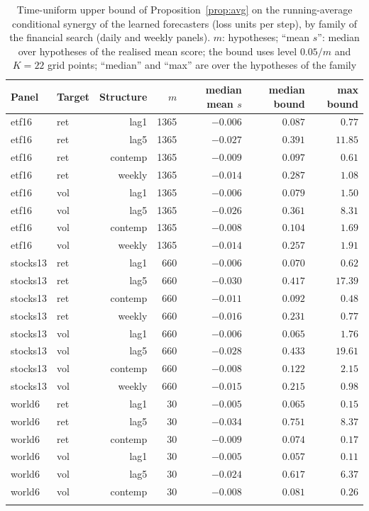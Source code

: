\documentclass[pdflatex,sn-mathphys-ay]{sn-jnl}%
\theoremstyle{thmstyleone}%
\theoremstyle{thmstyletwo}%
\theoremstyle{thmstylethree}%
\begin{document}
\begin{appendices}
\begin{table}[h]
\caption{Time-uniform upper bound of Proposition~\ref{prop:avg} on the running-average conditional synergy of the learned forecasters (loss units per step), by family of the financial search
(daily and weekly panels). $m$: hypotheses; ``mean $s$'': median over hypotheses of the realised mean score; the bound uses level $0.05/m$ and $K=22$ grid points; ``median'' and ``max'' are over the hypotheses of the family}\label{tab:avgbound}
\footnotesize
\begin{tabular}{llrrrrr}
\toprule
Panel & Target & Structure & $m$ & median mean $s$ & median bound & max bound \\
\midrule
etf16 & ret & lag1 & 1365 & $-0.006$ & $0.087$ & $0.77$ \\
etf16 & ret & lag5 & 1365 & $-0.027$ & $0.391$ & $11.85$ \\
etf16 & ret & contemp & 1365 & $-0.009$ & $0.097$ & $0.61$ \\
etf16 & ret & weekly & 1365 & $-0.014$ & $0.287$ & $1.08$ \\
etf16 & vol & lag1 & 1365 & $-0.006$ & $0.079$ & $1.50$ \\
etf16 & vol & lag5 & 1365 & $-0.026$ & $0.361$ & $8.31$ \\
etf16 & vol & contemp & 1365 & $-0.008$ & $0.104$ & $1.69$ \\
etf16 & vol & weekly & 1365 & $-0.014$ & $0.257$ & $1.91$ \\
stocks13 & ret & lag1 & 660 & $-0.006$ & $0.070$ & $0.62$ \\
stocks13 & ret & lag5 & 660 & $-0.030$ & $0.417$ & $17.39$ \\
stocks13 & ret & contemp & 660 & $-0.011$ & $0.092$ & $0.48$ \\
stocks13 & ret & weekly & 660 & $-0.016$ & $0.231$ & $0.77$ \\
stocks13 & vol & lag1 & 660 & $-0.006$ & $0.065$ & $1.76$ \\
stocks13 & vol & lag5 & 660 & $-0.028$ & $0.433$ & $19.61$ \\
stocks13 & vol & contemp & 660 & $-0.008$ & $0.122$ & $2.15$ \\
stocks13 & vol & weekly & 660 & $-0.015$ & $0.215$ & $0.98$ \\
world6 & ret & lag1 & 30 & $-0.005$ & $0.065$ & $0.15$ \\
world6 & ret & lag5 & 30 & $-0.034$ & $0.751$ & $8.37$ \\
world6 & ret & contemp & 30 & $-0.009$ & $0.074$ & $0.17$ \\
world6 & vol & lag1 & 30 & $-0.005$ & $0.057$ & $0.11$ \\
world6 & vol & lag5 & 30 & $-0.024$ & $0.617$ & $6.37$ \\
world6 & vol & contemp & 30 & $-0.008$ & $0.081$ & $0.26$ \\
\botrule
\end{tabular}
\end{table}

\end{appendices}


\end{document}
